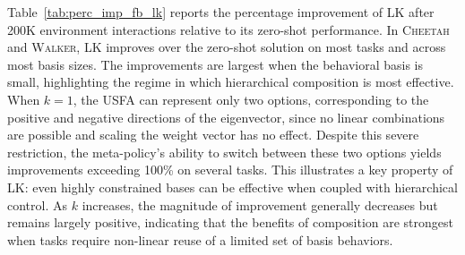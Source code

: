 \documentclass{article}
\theoremstyle{plain}
\theoremstyle{definition}
\theoremstyle{remark}
\begin{document}
Table~\ref{tab:perc_imp_fb_lk} reports the percentage improvement of LK after 200K environment interactions relative to its zero-shot performance. In \textsc{Cheetah} and \textsc{Walker}, LK improves over the zero-shot solution on most tasks and across most basis sizes. The improvements are largest when the behavioral basis is small, highlighting the regime in which hierarchical composition is most effective. When $k=1$, the USFA can represent only two options, corresponding to the positive and negative directions of the eigenvector, since no linear combinations are possible and scaling the weight vector has no effect. Despite this severe restriction, the meta-policy’s ability to switch between these two options yields improvements exceeding 100\% on several tasks. This illustrates a key property of LK: even highly constrained bases can be effective when coupled with hierarchical control. As $k$ increases, the magnitude of improvement generally decreases but remains largely positive, indicating that the benefits of composition are strongest when tasks require non-linear reuse of a limited set of basis behaviors. 
\end{document}
